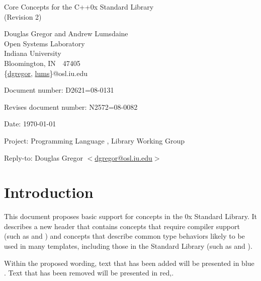 \documentclass[american,twoside]{book}
\begin{document}
\raggedbottom

\begin{titlepage}
\begin{center}
\huge
Core Concepts for the C++0x Standard Library\\
(Revision 2)
\vspace{0.25in}

\normalsize
Douglas Gregor and Andrew Lumsdaine \\
Open Systems Laboratory \\
Indiana University \\
Bloomington, IN\ \  47405 \\
\{\href{mailto:dgregor@osl.iu.edu}{dgregor}, \href{mailto:lums@osl.iu.edu}{lums}\}@osl.iu.edu
\end{center}

\vspace{0.25in}
\par\noindent Document number: D2621=08-0131\vspace{-6pt}
\par\noindent Revises document number: N2572=08-0082\vspace{-6pt}
\par\noindent Date: \today\vspace{-6pt}
\par\noindent Project: Programming Language \Cpp{}, Library Working Group\vspace{-6pt}
\par\noindent Reply-to: Douglas Gregor $<$\href{mailto:dgregor@osl.iu.edu}{dgregor@osl.iu.edu}$>$\vspace{-6pt}

\section*{Introduction}
This document proposes basic support for concepts in the \Cpp0x
Standard Library. It describes a new header  that
contains concepts that require compiler support (such as
 and ) and concepts that describe
common type behaviors likely to be used in many templates, including
those in the Standard Library (such as  and
). 

Within the proposed wording, text that has been added
\textcolor{addclr}{will be presented in blue} . Text that has been removed will be
presented \textcolor{remclr}{in red},.  


\end{titlepage}
\end{document}
